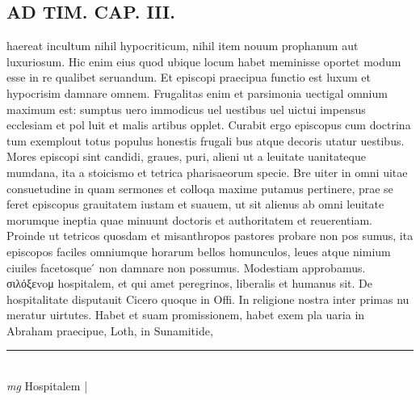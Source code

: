 \documentclass{article}
\begin{document}
\begin{pages}
\section*{AD TIM. CAP. III. }
\marginpar{[ p.126 ]}\pstart haereat incultum nihil hypocriticum, nihil item nouum prophanum aut luxuriosum. Hic enim eius quod ubique  locum habet meminisse oportet modum esse in re qualibet seruandum. Et episcopi praecipua functio est luxum et hypocrisim damnare omnem. Frugalitas enim et parsimonia uectigal omnium maximum est: sumptus uero immodicus uel uestibus uel uictui impensus ecclesiam et pol luit et malis artibus opplet. Curabit ergo episcopus cum doctrina tum exemplout totus populus honestis frugali bus atque decoris utatur uestibus. Mores episcopi sint candidi, graues, puri, alieni ut a leuitate uanitateque mumdana, ita a stoicismo et tetrica pharisaeorum specie. Bre uiter in omni uitae consuetudine in quam sermones et colloqa maxime putamus pertinere, prae se feret episcopus grauitatem iustam et suauem, ut sit alienus ab omni leuitate morumque ineptia quae minuunt doctoris et authoritatem et reuerentiam. Proinde ut tetricos quosdam et misanthropos pastores probare non pos sumus, ita episcopos faciles omniumque horarum bellos homunculos, leues atque nimium ciuiles facetosque ́ non damnare non possumus. Modestiam approbamus. σιλόξεvoμ hospitalem, et qui amet peregrinos, liberalis et humanus sit. De hospitalitate disputauit Cicero quoque in Offi. In religione nostra inter primas nu meratur uirtutes. Habet et suam promissionem, habet exem pla uaria in Abraham praecipue, Loth, in Sunamitide,  \pend
\vspace{0.5cm}\noindent
\vspace{0.2cm}\rule{1cm}{0.2pt}\\ 
\hspace{0.2cm}\textit{mg}
\footnotesize Hospitalem 
\normalsize| 

\end{pages}
\end{document}
